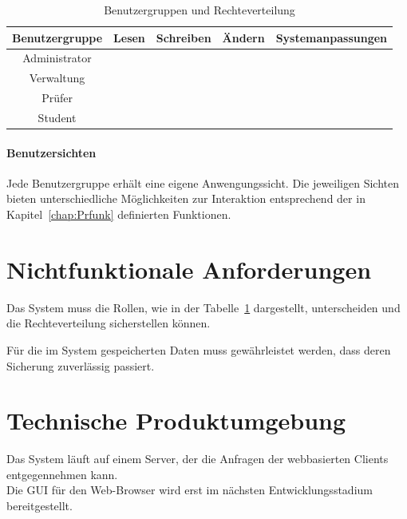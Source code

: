 	\begin{table}[H]
	\centering
	\caption{Benutzergruppen und Rechteverteilung}
	\begin{tabular}{|c|c|c|c|c|}
	\hline Benutzergruppe & Lesen & Schreiben & Ändern & Systemanpassungen \\ 
	\hline Administrator & \checkmark & \checkmark & \checkmark & \checkmark \\ 
	\hline Verwaltung & \checkmark & \checkmark & \checkmark &  \\ 
	\hline Prüfer & \checkmark & \checkmark &  &  \\ 
	\hline Student & \checkmark &  &  &  \\ 
	\hline 
	\end{tabular} 
	\label{tab:usergroup}
	\end{table}
	
	\paragraph{Benutzersichten}
	
	Jede Benutzergruppe erhält eine eigene Anwengungssicht. Die jeweiligen Sichten bieten unterschiedliche Möglichkeiten zur Interaktion entsprechend der in Kapitel~\ref{chap:Prfunk} definierten Funktionen.
	

	
	\section{Nichtfunktionale Anforderungen}
	
	\begin{description}
	\item[/Q10/] Das System muss die Rollen, wie in der Tabelle~\ref{tab:usergroup} dargestellt, unterscheiden und die Rechteverteilung sicherstellen können.
	\item[/Q20/] Für die im System gespeicherten Daten muss gewährleistet werden, dass deren Sicherung zuverlässig passiert.
	\end{description} 

	
	
	
	\section{Technische Produktumgebung}
	
	Das System läuft auf einem Server, der die Anfragen der webbasierten Clients entgegennehmen kann.\\
	Die GUI für den Web-Browser wird erst im nächsten Entwicklungsstadium bereitgestellt.
	
